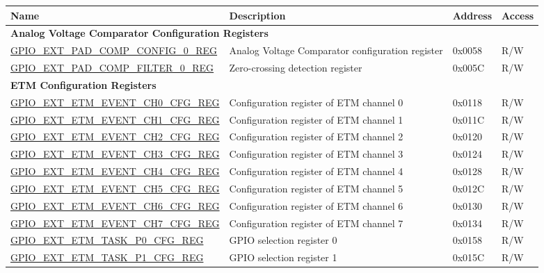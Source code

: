 \begin{longtable}{ | p{6cm} | p{7.2cm} | p{1.3cm} | p{1cm} | }
\hline\rowcolor{lightgray}
\textbf{Name} & \textbf{Description} &  \textbf{Address} & \textbf{Access} \\ \hline
\endhead
\multicolumn{4}{|l|}{\textbf{Analog Voltage Comparator Configuration Registers}} \\ \hline
\hyperref[regdesc:GPIOEXTPADCOMPCONFIG0REG]{GPIO\_EXT\_PAD\_COMP\_CONFIG\_0\_REG} & Analog Voltage Comparator configuration register & 0x0058 & R/W \\ \hline
\hyperref[regdesc:GPIOEXTPADCOMPFILTER0REG]{GPIO\_EXT\_PAD\_COMP\_FILTER\_0\_REG} & Zero-crossing detection register & 0x005C & R/W \\ \hline
\multicolumn{4}{|l|}{\textbf{ETM Configuration Registers}} \\ \hline
\hyperref[regdesc:GPIOEXTETMEVENTCHNCFGREG]{GPIO\_EXT\_ETM\_EVENT\_CH0\_CFG\_REG} & Configuration register of ETM channel 0 & 0x0118 & R/W \\ \hline
\hyperref[regdesc:GPIOEXTETMEVENTCHNCFGREG]{GPIO\_EXT\_ETM\_EVENT\_CH1\_CFG\_REG} & Configuration register of ETM channel 1 & 0x011C & R/W \\ \hline
\hyperref[regdesc:GPIOEXTETMEVENTCHNCFGREG]{GPIO\_EXT\_ETM\_EVENT\_CH2\_CFG\_REG} & Configuration register of ETM channel 2 & 0x0120 & R/W \\ \hline
\hyperref[regdesc:GPIOEXTETMEVENTCHNCFGREG]{GPIO\_EXT\_ETM\_EVENT\_CH3\_CFG\_REG} & Configuration register of ETM channel 3 & 0x0124 & R/W \\ \hline
\hyperref[regdesc:GPIOEXTETMEVENTCHNCFGREG]{GPIO\_EXT\_ETM\_EVENT\_CH4\_CFG\_REG} & Configuration register of ETM channel 4 & 0x0128 & R/W \\ \hline
\hyperref[regdesc:GPIOEXTETMEVENTCHNCFGREG]{GPIO\_EXT\_ETM\_EVENT\_CH5\_CFG\_REG} & Configuration register of ETM channel 5 & 0x012C & R/W \\ \hline
\hyperref[regdesc:GPIOEXTETMEVENTCHNCFGREG]{GPIO\_EXT\_ETM\_EVENT\_CH6\_CFG\_REG} & Configuration register of ETM channel 6 & 0x0130 & R/W \\ \hline
\hyperref[regdesc:GPIOEXTETMEVENTCHNCFGREG]{GPIO\_EXT\_ETM\_EVENT\_CH7\_CFG\_REG} & Configuration register of ETM channel 7 & 0x0134 & R/W \\ \hline
\hyperref[regdesc:GPIOEXTETMTASKP0CFGREG]{GPIO\_EXT\_ETM\_TASK\_P0\_CFG\_REG} & GPIO selection register 0 & 0x0158 & R/W \\ \hline
\hyperref[regdesc:GPIOEXTETMTASKP1CFGREG]{GPIO\_EXT\_ETM\_TASK\_P1\_CFG\_REG} & GPIO selection register 1 & 0x015C & R/W \\ \hline

\end{longtable}
